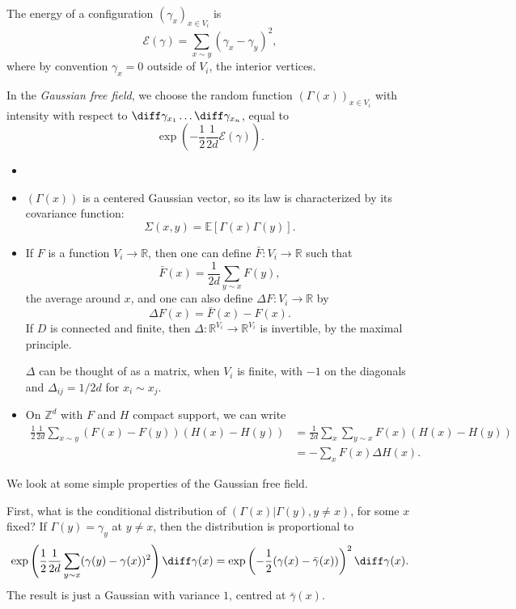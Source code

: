 \documentclass[12pt]{article}
\begin{document}
The energy of a configuration $(\gamma_x)_{x \in V_i}$ is
\[
\mathcal{E}(\gamma) = \sum_{x \sim y} (\gamma_x - \gamma_y)^2,
\]
where by convention $\gamma_x = 0$ outside of $V_i$, the interior vertices.

In the \emph{Gaussian free field}, we choose the random function $(\Gamma(x))_{x \in V_i}$ with intensity with respect to $\diff \gamma_{x_1} \ldots \diff \gamma_{x_n}$, equal to
\[
	\exp \left( - \frac 12 \frac 1{2d} \mathcal{E}(\gamma) \right).
\]


\begin{remark}
	\begin{itemize}
		\item[]
		\item $(\Gamma(x))$ is a centered Gaussian vector, so its law is characterized by its covariance function:
			\[
			\Sigma(x, y) = \mathbb{E}[\Gamma(x) \Gamma(y)].
			\]
		\item If $F$ is a function $V_i \to \mathbb{R}$, then one can define $\bar F : V_i \to \mathbb{R}$ such that
			\[
			\bar F(x) = \frac{1}{2d} \sum_{y \sim x} F(y),
			\]
			the average around $x$, and one can also define $\Delta F : V_i \to \mathbb{R}$ by
			\[
			\Delta F (x) = \bar F(x) - F(x).
			\]
			If $D$ is connected and finite, then $\Delta : \mathbb{R}^{V_i} \to \mathbb{R}^{V_i}$ is invertible, by the maximal principle.

			$\Delta$ can be thought of as a matrix, when $V_i$ is finite, with $-1$ on the diagonals and $\Delta_{ij} = 1/2d$ for $x_i \sim x_j$.
		\item On $\mathbb{Z}^{d}$ with $F$ and $H$ compact support, we can write
			\begin{align*}
				\frac12 \frac1{2d} \sum_{x \sim y} (F(x) - F(y)) (H(x) - H(y)) &= \frac1{2d} \sum_x \sum_{y \sim x} F(x) (H(x) - H(y)) \\
											       &= - \sum_x F(x) \Delta H(x).
			\end{align*}
	\end{itemize}
\end{remark}

We look at some simple properties of the Gaussian free field.

First, what is the conditional distribution of $(\Gamma(x) | \Gamma(y), y \neq x)$, for some $x$ fixed? If $\Gamma(y) = \gamma_y$ at $y \neq x$, then the distribution is proportional to
\[
	\exp \left( \frac 12 \frac 1{2d} \sum_{y \sim x} (\gamma(y) - \gamma(x))^2 \right) \diff \gamma(x) = \exp \left( - \frac 12 (\gamma(x) - \bar \gamma(x)) \right)^2 \diff \gamma(x).
\]
The result is just a Gaussian with variance $1$, centred at $\bar \gamma(x)$.
\end{document}
